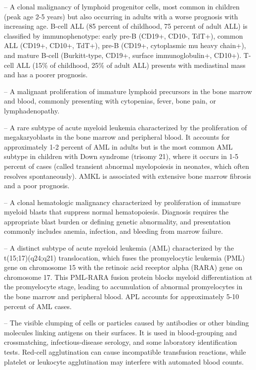 -- A clonal malignancy of lymphoid progenitor cells, most common in children (peak age 2-5 years) but also occurring in adults with a worse prognosis with increasing age. B-cell ALL (85 percent of childhood, 75 percent of adult ALL) is classified by immunophenotype: early pre-B (CD19+, CD10-, TdT+), common ALL (CD19+, CD10+, TdT+), pre-B (CD19+, cytoplasmic mu heavy chain+), and mature B-cell (Burkitt-type, CD19+, surface immunoglobulin+, CD10+). T-cell ALL (15\% of childhood, 25\% of adult ALL) presents with mediastinal mass and has a poorer prognosis.

-- A malignant proliferation of immature lymphoid precursors in the bone marrow and blood, commonly presenting with cytopenias, fever, bone pain, or lymphadenopathy.

-- A rare subtype of acute myeloid leukemia characterized by the proliferation of megakaryoblasts in the bone marrow and peripheral blood. It accounts for approximately 1-2 percent of AML in adults but is the most common AML subtype in children with Down syndrome (trisomy 21), where it occurs in 1-5 percent of cases (called transient abnormal myelopoiesis in neonates, which often resolves spontaneously). AMKL is associated with extensive bone marrow fibrosis and a poor prognosis.

-- A clonal hematologic malignancy characterized by proliferation of immature myeloid blasts that suppress normal hematopoiesis. Diagnosis requires the appropriate blast burden or defining genetic abnormality, and presentation commonly includes anemia, infection, and bleeding from marrow failure.

-- A distinct subtype of acute myeloid leukemia (AML) characterized by the t(15;17)(q24;q21) translocation, which fuses the promyelocytic leukemia (PML) gene on chromosome 15 with the retinoic acid receptor alpha (RARA) gene on chromosome 17. This PML-RARA fusion protein blocks myeloid differentiation at the promyelocyte stage, leading to accumulation of abnormal promyelocytes in the bone marrow and peripheral blood. APL accounts for approximately 5-10 percent of AML cases.

-- The visible clumping of cells or particles caused by antibodies or other binding molecules linking antigens on their surfaces. It is used in blood-grouping and crossmatching, infectious-disease serology, and some laboratory identification tests. Red-cell agglutination can cause incompatible transfusion reactions, while platelet or leukocyte agglutination may interfere with automated blood counts.

